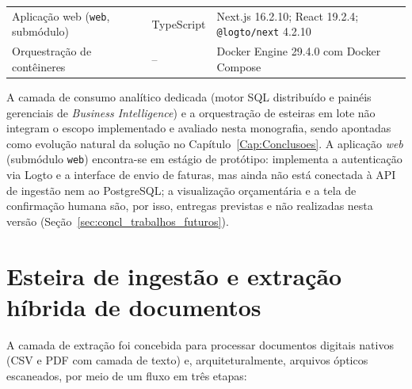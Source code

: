 \begin{table}[htb]
\begin{tabularx}{\textwidth}{>{\raggedright\arraybackslash}p{4.4cm} p{2.1cm} X}
		Aplicação web (\texttt{web}, submódulo) & TypeScript & Next.js 16.2.10; React 19.2.4; \texttt{@logto/next} 4.2.10 \\
		Orquestração de contêineres & -- & Docker Engine 29.4.0 com Docker Compose \\
		\bottomrule
	\end{tabularx}
\end{table}

A camada de consumo analítico dedicada (motor SQL distribuído e painéis gerenciais de \textit{Business Intelligence}) e a orquestração de esteiras em lote não integram o escopo implementado e avaliado nesta monografia, sendo apontadas como evolução natural da solução no Capítulo~\ref{Cap:Conclusoes}. A aplicação \textit{web} (submódulo \texttt{web}) encontra-se em estágio de protótipo: implementa a autenticação via Logto e a interface de envio de faturas, mas ainda não está conectada à API de ingestão nem ao PostgreSQL; a visualização orçamentária e a tela de confirmação humana são, por isso, entregas previstas e não realizadas nesta versão (Seção~\ref{sec:concl_trabalhos_futuros}).

\section{Esteira de ingestão e extração híbrida de documentos}
\label{sec:sol_extracao_hibrida}

A camada de extração foi concebida para processar documentos digitais nativos (CSV e PDF com camada de texto) e, arquiteturalmente, arquivos ópticos escaneados, por meio de um fluxo em três etapas:

